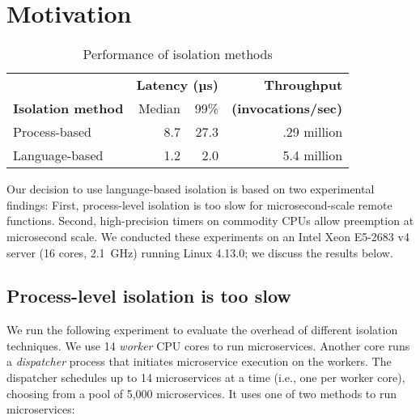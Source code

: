 \section{Motivation}
\label{sec:motive}

\begin{table}
\begin{center}
\small
\begin{tabular}{lrrr}
   & \multicolumn{2}{c}{\textbf{Latency (µs)}} & \textbf{Throughput} \\
  \textbf{Isolation method} & Median & 99\% & \textbf{(invocations/sec)} \\
\midrule
Process-based & 8.7 & 27.3 & .29 million \\
Language-based & 1.2 & 2.0 & 5.4 million \\
\end{tabular}
\caption{Performance of isolation methods}
\label{tab:isolation_methods}
\end{center}
\end{table}

Our decision to use language-based isolation is based on two experimental
findings:  First, process-level isolation is too slow for
microsecond-scale remote functions. Second, high-precision timers on commodity
CPUs allow preemption at microsecond scale.  We conducted these experiments
on an Intel Xeon E5-2683 v4 server (16 cores, 2.1~GHz) running
Linux 4.13.0; we discuss the results below.

\subsection{Process-level isolation is too slow}
We run the following experiment to evaluate the overhead of different isolation
techniques. We use 14 \emph{worker} CPU cores to run microservices. Another core 
runs a \emph{dispatcher} process that initiates microservice execution on the workers.
The dispatcher schedules up to 14 microservices at a time (i.e., one
per worker core), choosing from a pool of 5,000 microservices. It uses one of two
methods to run microservices:

